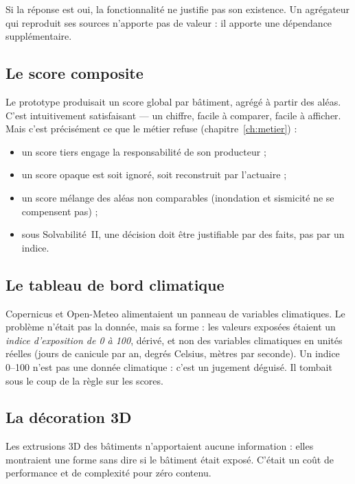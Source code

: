 Si la réponse est oui, la fonctionnalité ne justifie pas son existence. Un
agrégateur qui reproduit ses sources n'apporte pas de valeur : il apporte une
dépendance supplémentaire.

\subsection{Le score composite}

Le prototype produisait un score global par bâtiment, agrégé à partir des
aléas. C'est intuitivement satisfaisant — un chiffre, facile à comparer, facile
à afficher. Mais c'est précisément ce que le métier refuse (chapitre~\ref{ch:metier}) :

\begin{itemize}[leftmargin=1.4em]
  \item un score tiers engage la responsabilité de son producteur ;
  \item un score opaque est soit ignoré, soit reconstruit par l'actuaire ;
  \item un score mélange des aléas non comparables (inondation et sismicité ne
        se compensent pas) ;
  \item sous Solvabilité~II, une décision doit être justifiable par des faits,
        pas par un indice.
\end{itemize}

\subsection{Le tableau de bord climatique}

Copernicus et Open-Meteo alimentaient un panneau de variables climatiques. Le
problème n'était pas la donnée, mais sa forme : les valeurs exposées étaient un
\emph{indice d'exposition de 0 à 100}, dérivé, et non des variables
climatiques en unités réelles (jours de canicule par an, degrés Celsius,
mètres par seconde). Un indice 0--100 n'est pas une donnée climatique : c'est
un jugement déguisé. Il tombait sous le coup de la règle sur les scores.

\subsection{La décoration 3D}

Les extrusions 3D des bâtiments n'apportaient aucune information : elles
montraient une forme sans dire si le bâtiment était exposé. C'était un coût de
performance et de complexité pour zéro contenu.

